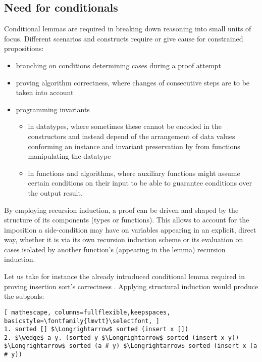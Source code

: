 \label{sec:conditionals}

\subsection{Need for conditionals}

Conditional lemmas are required in breaking down reasoning into small units of focus.
%
Different scenarios and constructs require or give cause for constrained propositions:

\begin{itemize}
\item branching on conditions determining cases during a proof attempt
\item proving algorithm correctness, where changes of consecutive steps are to be taken into account
\item programming invariants
\begin{itemize}
\item in datatypes, where sometimes these cannot be encoded in the constructors and instead depend of the arrangement of data values conforming an instance and invariant preservation by from functions manipulating the datatype
\item in functions and algorithms, where auxiliary functions might assume certain conditions on their input to be able to guarantee conditions over the output result.
\end{itemize}
\end{itemize}

By employing recursion induction, a proof can be driven and shaped by the structure of its components (types or functions).
%
This allows to account for the imposition a side-condition may have on variables appearing in an explicit, direct way, whether it is via its own recursion induction scheme or its evaluation on cases isolated by another function's (appearing in the lemma) recursion induction.


Let us take for instance the already introduced conditional lemma required in proving insertion sort's correctness .
%
Applying structural induction would produce the subgoals:

\begin{lstlisting}[ mathescape, columns=fullflexible,keepspaces, basicstyle=\fontfamily{lmvtt}\selectfont, ]
1. sorted [] $\Longrightarrow$ sorted (insert x [])
2. $\wedge$ a y. (sorted y $\Longrightarrow$ sorted (insert x y)) $\Longrightarrow$ sorted (a # y) $\Longrightarrow$ sorted (insert x (a # y))
\end{lstlisting}

